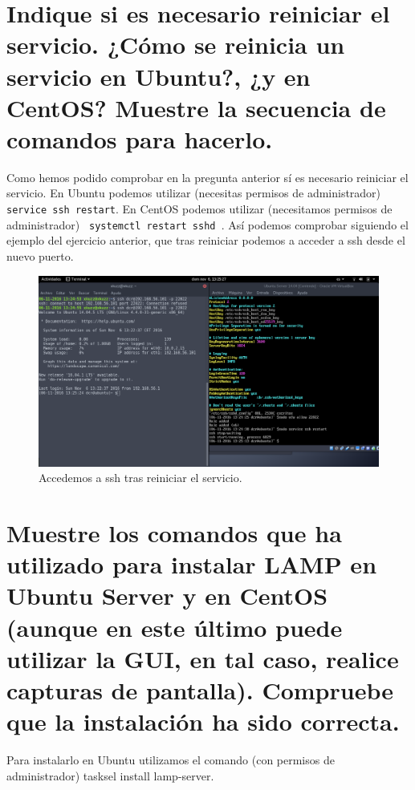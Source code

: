 \begin{flushleft}
\section{Indique si es necesario reiniciar el servicio. ¿Cómo se reinicia un servicio en Ubuntu?, ¿y en CentOS? Muestre la secuencia de comandos para hacerlo.}
Como hemos podido comprobar en la pregunta anterior sí es necesario reiniciar el servicio.\linebreak
 En Ubuntu podemos utilizar (necesitas permisos de administrador) \verb| service ssh restart|\cite{c8a}.\linebreak
 En CentOS podemos utilizar (necesitamos permisos de administrador) \verb| systemctl restart sshd |\cite{c8b}. \linebreak
 Así podemos comprobar siguiendo el ejemplo del ejercicio anterior, que tras reiniciar podemos a acceder a ssh desde el nuevo puerto.
 \begin{figure}[H]
	\centering
	\includegraphics[scale=0.3]{servicioReiniciado.png}
	\caption{Accedemos a ssh tras reiniciar el servicio.}
\end{figure}

\section{Muestre los comandos que ha utilizado para instalar LAMP en Ubuntu Server y en CentOS (aunque en este último puede utilizar la GUI, en tal caso, realice capturas de pantalla). Compruebe que la instalación ha sido correcta.}
Para instalarlo en Ubuntu utilizamos el comando (con permisos de administrador) tasksel install lamp-server. \cite{c9a}


\end{flushleft}
